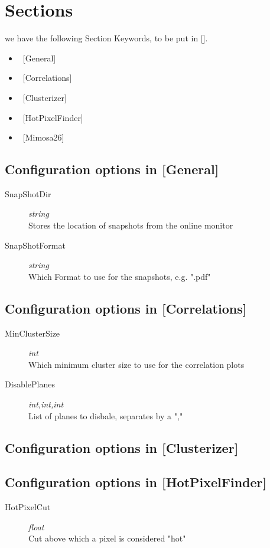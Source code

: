 \documentclass{article}
\begin{document}
\section{Sections}
we have the following Section Keywords, to be put in [].
\begin{itemize}
\item  ~[General]
\item ~[Correlations]
\item ~[Clusterizer]
\item ~[HotPixelFinder]
\item ~[Mimosa26]
\end{itemize}
\subsection{Configuration options in [General]} 
\begin{description}
\item[SnapShotDir] {\it string} \\Stores the location of snapshots from the online monitor
\item[SnapShotFormat] {\it string}\\ Which Format to use for the snapshots, e.g. ".pdf"
\end{description}
\subsection{Configuration options in [Correlations]}
\begin{description}
\item[MinClusterSize] {\it int} \\
Which minimum cluster size to use for the correlation plots  
\item[DisablePlanes] {\it int,int,int} \\
List of planes to disbale, separates by a ","
\end{description}
\subsection{Configuration options in [Clusterizer]}
\subsection{Configuration options in [HotPixelFinder]}
\begin{description}
\item[HotPixelCut] {\it float} \\ Cut above which a pixel is considered "hot"
\end{description}
\end{document}
